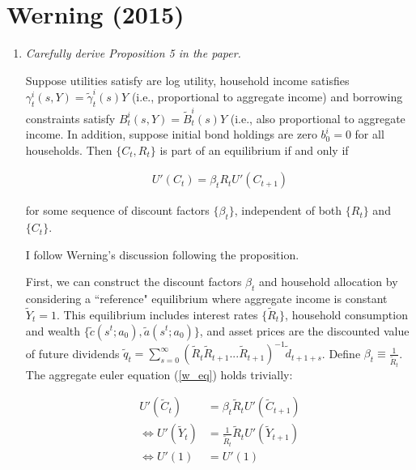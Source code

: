 \documentclass{article}
\newenvironment{manualtheorem}[1]{%
  \renewcommand\themanualtheoreminner{#1}%
  \manualtheoreminner
}{\endmanualtheoreminner}
\begin{document}
\pagebreak

\section{Werning (2015)}

\begin{enumerate}

\item \textit{Carefully derive Proposition 5 in the paper.}

\begin{manualtheorem}{5} 
Suppose utilities satisfy are log utility, household income satisfies $\gamma_t^i (s, Y) = \tilde \gamma_t^i(s) Y$ (i.e., proportional to aggregate income) and borrowing constraints satisfy $B_t^i(s, Y) = \tilde B_t^i (s) Y$ (i.e., also proportional to aggregate income. In addition, suppose initial bond holdings are zero $b^i_0 = 0$ for
all households. Then $\{C_t, R_t\}$ is part of an equilibrium if and only if

\begin{align}
U'(C_t) = \beta_t R_t U'(C_{t+1}) \label{w_eq}
\end{align}

for some sequence of discount factors $\{\beta_t\}$, independent of both $\{R_t\}$ and $\{C_t\}$.

\end{manualtheorem}

\bigskip

I follow Werning's discussion following the proposition.

First, we can construct the discount factors $\beta_t$ and household allocation by considering a ``reference" equilibrium where aggregate income is constant $\tilde Y_t = 1$. This equilibrium includes interest rates $\{\tilde R_t\}$, household consumption and wealth $\{\tilde c(s^t;a_0), \tilde a(s^t; a_0)\}$, and asset prices are the discounted value of future dividends $\tilde q_t = \sum_{s=0}^\infty (\tilde R_t \tilde R_{t+1} ... \tilde R_{t+1})^{-1} \tilde d_{t+1+s}$. Define $\beta_t \equiv \frac{1}{\tilde R_t}$.  The aggregate euler equation (\ref{w_eq}) holds trivially:

\begin{align*}
U'(\tilde C_t) &= \beta_t \tilde R_t U'(\tilde C_{t+1}) \\
\iff
U'(\tilde Y_t) &= \frac{1}{\tilde R_t} \tilde R_t U'(\tilde Y_{t+1}) \\
\iff
U'(1) &= U'(1)
\end{align*}


\end{enumerate}
\end{document}
